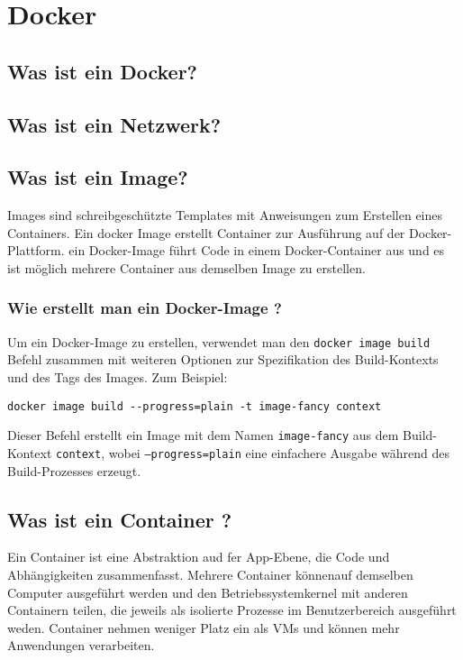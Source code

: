 \section{Docker}\label{Docker}


\subsection{Was ist ein Docker?}


\subsection{Was ist ein Netzwerk?}


\subsection{Was ist ein Image?}

Images sind schreibgeschützte Templates mit Anweisungen zum Erstellen eines Containers. Ein docker Image erstellt Container zur Ausführung auf der Docker-Plattform. ein Docker-Image führt Code in einem Docker-Container aus und es ist möglich mehrere Container aus demselben Image zu erstellen.

\subsubsection{Wie erstellt man ein Docker-Image ?}

Um ein Docker-Image zu erstellen, verwendet man den \texttt{docker image build} Befehl zusammen mit weiteren Optionen zur Spezifikation des Build-Kontexts und des Tags des Images. Zum Beispiel:

\begin{verbatim}
docker image build --progress=plain -t image-fancy context
\end{verbatim}

Dieser Befehl erstellt ein Image mit dem Namen \texttt{image-fancy} aus dem Build-Kontext \texttt{context}, wobei \texttt{--progress=plain} eine einfachere Ausgabe während des Build-Prozesses erzeugt.

\subsection{Was ist ein Container ? }

Ein Container ist eine Abstraktion aud fer App-Ebene, die Code und Abhängigkeiten zusammenfasst. Mehrere Container könnenauf demselben Computer ausgeführt werden und den Betriebssystemkernel mit anderen Containern teilen, die jeweils als isolierte Prozesse im Benutzerbereich ausgeführt weden. Container nehmen weniger Platz ein als VMs und können mehr Anwendungen verarbeiten.

